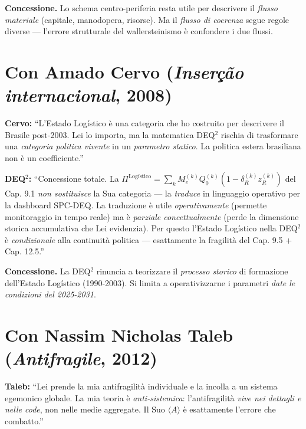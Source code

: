 \textbf{Concessione.} Lo schema centro-periferia resta utile per
descrivere il \emph{flusso materiale} (capitale, manodopera, risorse).
Ma il \emph{flusso di coerenza} segue regole diverse --- l'errore
strutturale del wallersteinismo è confondere i due flussi.



\section{\texorpdfstring{Con Amado Cervo (\emph{Inserção internacional},
2008)}{Con Amado Cervo (Inserção internacional, 2008)}}\label{con-amado-cervo-inseruxe7uxe3o-internacional-2008}

\textbf{Cervo:} ``L'Estado Logístico è una categoria che ho costruito
per descrivere il Brasile post-2003. Lei lo importa, ma la matematica
DEQ$^2$ rischia di trasformare una \emph{categoria politica vivente} in un
\emph{parametro statico}. La politica estera brasiliana non è un
coefficiente.''

\textbf{DEQ$^2$:} ``Concessione totale. La
\(\Pi^{\text{Logístico}} = \sum_k M_e^{(k)} Q_0^{(k)} (1 - \delta_R^{(k)} z_R^{(k)})\)
del Cap. 9.1 \emph{non sostituisce} la Sua categoria --- la
\emph{traduce} in linguaggio operativo per la dashboard SPC-DEQ. La
traduzione è utile \emph{operativamente} (permette monitoraggio in tempo
reale) ma è \emph{parziale concettualmente} (perde la dimensione storica
accumulativa che Lei evidenzia). Per questo l'Estado Logístico nella
DEQ$^2$ è \emph{condizionale} alla continuità politica --- esattamente la
fragilità del Cap. 9.5 + Cap. 12.5.''

\textbf{Concessione.} La DEQ$^2$ rinuncia a teorizzare il \emph{processo
storico} di formazione dell'Estado Logístico (1990-2003). Si limita a
operativizzarne i parametri \emph{date le condizioni del 2025-2031}.



\section{\texorpdfstring{Con Nassim Nicholas Taleb (\emph{Antifragile},
2012)}{Con Nassim Nicholas Taleb (Antifragile, 2012)}}\label{con-nassim-nicholas-taleb-antifragile-2012}

\textbf{Taleb:} ``Lei prende la mia antifragilità individuale e la
incolla a un sistema egemonico globale. La mia teoria è
\emph{anti-sistemica}: l'antifragilità \emph{vive nei dettagli e nelle
code}, non nelle medie aggregate. Il Suo \(\langle A\rangle\) è
esattamente l'errore che combatto.''

